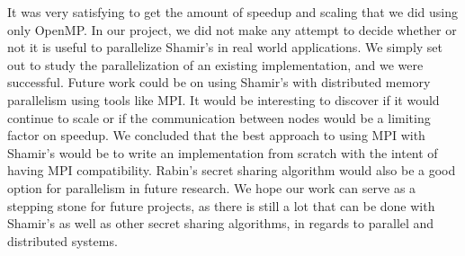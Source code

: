 \documentclass[main.tex]{subfiles}
\begin{document}
\indent It was very satisfying to get the amount of speedup and scaling that we did using only OpenMP. In our project, we did not make any attempt to decide whether or not it is useful to parallelize Shamir's in real world applications. We simply set out to study the parallelization of an existing implementation, and we were successful. Future work could be on using Shamir's with distributed memory parallelism using tools like MPI. It would be interesting to discover if it would continue to scale or if the communication between nodes would be a limiting factor on speedup. We concluded that the best approach to using MPI with Shamir's would be to write an implementation from scratch with the intent of having MPI compatibility. Rabin's secret sharing algorithm \cite{five} would also be a good option for parallelism in future research. We hope our work can serve as a stepping stone for future projects, as there is still a lot that can be done with Shamir's as well as other secret sharing algorithms, in regards to parallel and distributed systems.


\end{document}
